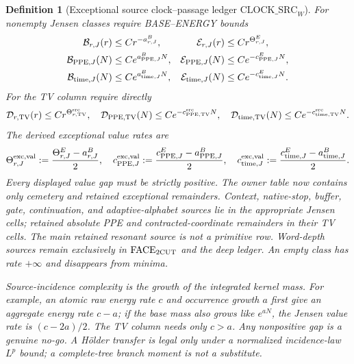 \documentclass[11pt]{article}
\newtheorem{definition}[theorem]{Definition}
\begin{document}
\begin{definition}[Exceptional source clock--passage ledger
$\mathrm{CLOCK\_SRC}_{W}$]
For nonempty Jensen classes require BASE--ENERGY bounds
\begin{align}
 \mathcal B_{r,J}(r)&\le Cr^{-a_{r,J}^{B}},&
 \mathcal E_{r,J}(r)&\le Cr^{\Theta_{r,J}^{E}},\notag\\
 \mathcal B_{\mathrm{PPE},J}(N)&\le Ce^{a_{\mathrm{PPE},J}^{B}N},&
 \mathcal E_{\mathrm{PPE},J}(N)&\le Ce^{-c_{\mathrm{PPE},J}^{E}N},\notag\\
 \mathcal B_{\mathrm{time},J}(N)&\le Ce^{a_{\mathrm{time},J}^{B}N},&
 \mathcal E_{\mathrm{time},J}(N)&\le Ce^{-c_{\mathrm{time},J}^{E}N}.
 \label{eq:clock-source-matrix-tails}
\end{align}
For the TV column require directly
\begin{equation}
 \mathcal D_{r,\mathrm{TV}}(r)\le Cr^{\Theta_{r,\mathrm{TV}}^{\rm src}},
 \quad
 \mathcal D_{\mathrm{PPE},\mathrm{TV}}(N)
     \le Ce^{-c_{\mathrm{PPE},\mathrm{TV}}^{\rm src}N},
 \quad
 \mathcal D_{\mathrm{time},\mathrm{TV}}(N)
     \le Ce^{-c_{\mathrm{time},\mathrm{TV}}^{\rm src}N}.
\end{equation}
The derived exceptional value rates are
\begin{equation}
\label{eq:exceptional-Jensen-value-rates}
 \Theta_{r,J}^{\rm exc,val}:=
   \frac{\Theta_{r,J}^{E}-a_{r,J}^{B}}2,
 \quad
 c_{\mathrm{PPE},J}^{\rm exc,val}:=
   \frac{c_{\mathrm{PPE},J}^{E}-a_{\mathrm{PPE},J}^{B}}2,
 \quad
 c_{\mathrm{time},J}^{\rm exc,val}:=
   \frac{c_{\mathrm{time},J}^{E}-a_{\mathrm{time},J}^{B}}2.
\end{equation}
Every displayed value gap must be strictly positive.  The owner table now
contains only cemetery and retained exceptional remainders.  Context,
native-stop, buffer, gate, continuation, and adaptive-alphabet sources lie in the
appropriate Jensen cells; retained absolute PPE and contracted-coordinate
remainders in their TV cells.  The main retained resonant source is not a
primitive row.  Word-depth sources remain exclusively in
$\mathrm{FACE}_{\rm 2CUT}$ and the deep ledger.  An empty class has rate
$+\infty$ and disappears from minima.

Source-incidence complexity is the growth of the integrated kernel mass.
For example, an atomic raw energy rate $c$ and occurrence growth $a$ first
give an aggregate energy rate $c-a$; if the base mass also grows like
$e^{aN}$, the Jensen value rate is $(c-2a)/2$.  The TV column needs only
$c>a$.  Any nonpositive gap is a genuine no-go.  A H\"older transfer is
legal only under a normalized incidence-law $L^p$ bound; a complete-tree
branch moment is not a substitute.
\end{definition}
\end{document}
